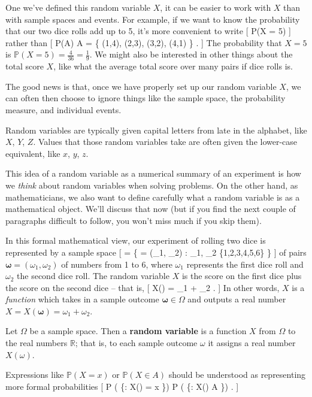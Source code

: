\documentclass[
  letterpaper,
]{report}
\theoremstyle{definition}
\theoremstyle{definition}
\theoremstyle{remark}
\begin{document}
One we've defined this random variable \(X\), it can be easier to work
with \(X\) than with sample spaces and events. For example, if we want
to know the probability that our two dice rolls add up to 5, it's more
convenient to write {[} \mathbb P(X = 5) {]} rather than {[}
\mathbb P(A) \quad {} \quad A = \big\{ (1,4), (2,3), (3,2),
(4,1) \big\} . {]} The probability that \(X = 5\) is
\(\mathbb P(X = 5) = \frac{4}{36} = \frac{1}{9}\). We might also be
interested in other things about the total score \(X\), like what the
average total score over many pairs if dice rolls is.

The good news is that, once we have properly set up our random variable
\(X\), we can often then choose to ignore things like the sample space,
the probability measure, and individual events.

Random variables are typically given capital letters from late in the
alphabet, like \(X\), \(Y\), \(Z\). Values that those random variables
take are often given the lower-case equivalent, like \(x\), \(y\),
\(z\).

This idea of a random variable as a numerical summary of an experiment
is how we \emph{think} about random variables when solving problems. On
the other hand, as mathematicians, we also want to define carefully what
a random variable is as a mathematical object. We'll discuss that now
(but if you find the next couple of paragraphs difficult to follow, you
won't miss much if you skip them).

In this formal mathematical view, our experiment of rolling two dice is
represented by a sample space {[} \Omega = \big\{ \boldsymbol\omega =
(\omega\_1, \omega\_2) : \omega\_1, \omega\_2 \in \{1,2,3,4,5,6\} \big\}
{]} of pairs \(\boldsymbol\omega = (\omega_1, \omega_2)\) of numbers
from 1 to 6, where \(\omega_1\) represents the first dice roll and
\(\omega_2\) the second dice roll. The random variable \(X\) is the
score on the first dice plus the score on the second dice -- that is,
{[} X(\boldsymbol\omega) = \omega\_1 + \omega\_2 . {]} In other words,
\(X\) is a \emph{function} which takes in a sample outcome
\(\boldsymbol\omega \in \Omega\) and outputs a real number
\(X = X(\boldsymbol\omega) = \omega_1 + \omega_2\).

Let \(\Omega\) be a sample space. Then a \textbf{random variable} is a
function \(X\) from \(\Omega\) to the real numbers \(\mathbb R\); that
is, to each sample outcome \(\omega\) it assigns a real number
\(X(\omega)\).

Expressions like \(\mathbb P(X = x)\) or \(\mathbb P(X \in A)\) should
be understood as representing more formal probabilities {[} \mathbb P
\big( \{\omega : X(\omega) = x \}\big) \quad {} \quad \mathbb P
\big( \{\omega : X(\omega) \in A \}\big) . {]}
\end{document}
